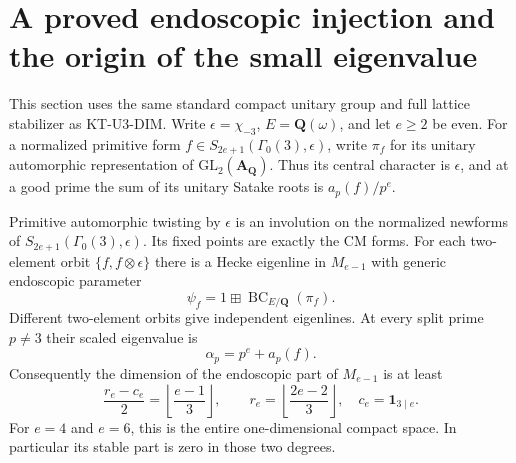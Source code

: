 \section{A proved endoscopic injection and the origin of the small eigenvalue}
\label{sec:kt-endoscopic}

This section uses the same standard compact unitary group and full
lattice stabilizer as KT-U3-DIM. Write $\epsilon=\chi_{-3}$,
$E=\mathbf Q(\omega)$, and let $e\geq2$ be even.
For a normalized primitive form
$f\in S_{2e+1}(\Gamma_0(3),\epsilon)$, write $\pi_f$ for its
unitary automorphic representation of $\mathrm{GL}_2(\mathbf A_{\mathbf Q})$.
Thus its central character is $\epsilon$, and at a good prime the
sum of its unitary Satake roots is $a_p(f)/p^e$.

\begin{theorem}
Primitive automorphic twisting by $\epsilon$ is an involution on
the normalized newforms of $S_{2e+1}(\Gamma_0(3),\epsilon)$.
Its fixed points are exactly the CM forms. For each two-element
orbit $\{f,f\otimes\epsilon\}$ there is a Hecke eigenline in
$M_{e-1}$ with generic endoscopic parameter
\[
             \psi_f=1\boxplus\operatorname{BC}_{E/\mathbf Q}(\pi_f).
\]
Different two-element orbits give independent eigenlines.
At every split prime $p\ne3$ their scaled eigenvalue is
\[
                  \alpha_p=p^e+a_p(f).                 \tag{KT-E.1}
\]
Consequently the dimension of the endoscopic part of $M_{e-1}$
is at least
\[
 \frac{r_e-c_e}{2}=\left\lfloor\frac{e-1}{3}\right\rfloor,
 \qquad
 r_e=\left\lfloor\frac{2e-2}{3}\right\rfloor,
 \quad c_e=\mathbf1_{3\mid e}.                         \tag{KT-E.2}
\]
For $e=4$ and $e=6$, this is the entire one-dimensional compact
space. In particular its stable part is zero in those two degrees.
\end{theorem}

